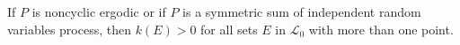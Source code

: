 If $P$ is noncyclic ergodic or if $P$ is a symmetric sum of independent random variables process, then $k(E) > 0$ for all sets $E$ in $\mathcal{L}_0$ with more than one point.
